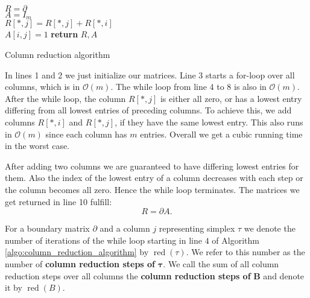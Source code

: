\begin{algorithm}[H]

$R = \partial$\\
$A = I_m$\\
{
    {
        $R[*,j] =  R[*,j] + R[*,i]$\\
        $A[i,j] = 1$ 
    }
}
\textbf{return} $R,A$
\caption{Column reduction algorithm}
\label{algo:column_reduction_algorithm}
\end{algorithm} 
\vspace{0.5cm}

In lines 1 and 2 we just initialize our matrices. Line 3 starts a for-loop over all columns, which is in $\mathcal{O}(m)$. The while loop from line 4 to 8 is also in $\mathcal{O}(m)$. After the while loop, the column $R[*,j]$ is either all zero, or has a lowest entry differing from all lowest entries of preceding columns. To achieve this, we add columns $R[*,i]$ and $R[*,j]$, if they have the same lowest entry. This also runs in $\mathcal{O}(m)$ since each column has $m$ entries. Overall we get a cubic running time in the worst case. 

After adding two columns we are guaranteed to have differing lowest entries for them. Also the index of the lowest entry of a column decreases with each step or the column becomes all zero. Hence the while loop terminates. The matrices we get returned in line 10 fulfill: \[
    R = \partial A.
\]

\begin{defi}
\label{def:col_red_steps}
For a boundary matrix $\partial$ and a column $j$ representing simplex $\tau$ we denote the number of iterations of the while loop starting in line $4$ of Algorithm \ref{algo:column_reduction_algorithm} by $\operatorname{red}(\tau)$. We refer to this number as the number of \textbf{column reduction steps of} $\bm{\tau}$. We call the sum of all column reduction steps over all columns the \textbf{column reduction steps of} $\bm{B}$ and denote it by $\operatorname{red}(B)$.
\end{defi}

